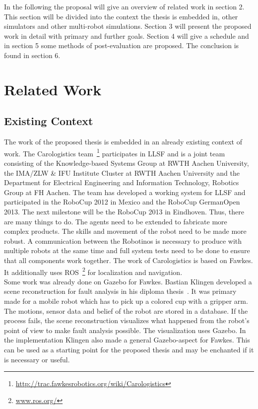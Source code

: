 \documentclass[11pt,a4paper,titlepage]{article}
\begin{document}
In the following the proposal will give an overview of related work in section 2. This section will be divided into the context the thesis is embedded in, other simulators and other multi-robot simulations. Section 3 will present the proposed work in detail with primary and further goals. Section 4 will give a schedule and in section 5 some methods of post-evaluation are proposed. The conclusion is found in section 6.


\section{Related Work}
\subsection{Existing Context}
The work of the proposed thesis is embedded in an already existing context of work. The Carologistics team~\footnote{\url{http://trac.fawkesrobotics.org/wiki/Carologistics}} participates in LLSF and is a joint team consisting of the Knowledge-based Systems Group at RWTH Aachen University, the IMA/ZLW \& IFU Institute Cluster at RWTH Aachen University and the Department for Electrical Engineering and Information Technology, Robotics Group at FH Aachen. The team has developed a working system for LLSF and participated in the RoboCup 2012 in Mexico and the RoboCup GermanOpen 2013. The next milestone will be the RoboCup 2013 in Eindhoven. Thus, there are many things to do. The agents need to be extended to fabricate more complex products. The skills and movement of the robot need to be made more robust. A communication between the Robotinos is necessary to produce with multiple robots at the same time and full system tests need to be done to ensure that all components work together. The work of Carologistics is based on Fawkes. It additionally uses ROS~\footnote{\url{www.ros.org/}} for localization and navigation.\\
Some work was already done on Gazebo for Fawkes. Bastian Klingen developed a scene reconstruction for fault analysis in his diploma thesis~\cite{KlingenDA}. It was primary made for a mobile robot which has to pick up a colored cup with a gripper arm. The motions, sensor data and belief of the robot are stored in a database. If the process fails, the scene reconstruction visualizes what happened from the robot's point of view to make fault analysis possible. The visualization uses Gazebo. In the implementation Klingen also made a general Gazebo-aspect for Fawkes. This can be used as a starting point for the proposed thesis and may be enchanted if it is necessary or useful.
\end{document}

